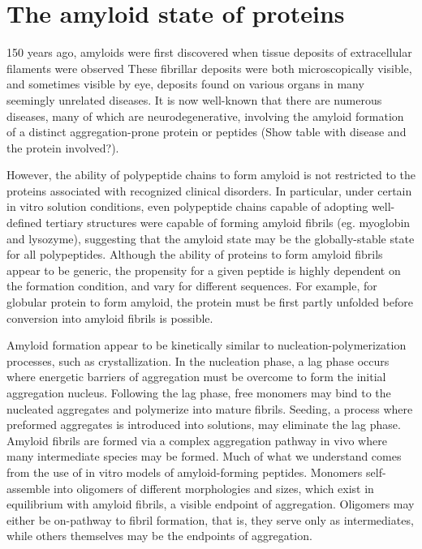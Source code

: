 \section{The amyloid state of proteins}

150 years ago, amyloids were first discovered when tissue deposits of extracellular filaments were observed\cite{Haass:2007db,Sipe:2000fs} These fibrillar deposits were both microscopically visible, and sometimes visible by eye, deposits found on various organs in many seemingly unrelated diseases. It is now well-known that there are numerous diseases, many of which are neurodegenerative, involving the amyloid formation of a distinct aggregation-prone protein or peptides (Show table with disease and the protein involved?).

However, the ability of polypeptide chains to form amyloid is not restricted to the proteins associated with recognized clinical disorders. In particular, under certain in vitro solution conditions, even polypeptide chains capable of adopting well-defined tertiary structures were capable of forming amyloid fibrils (eg. myoglobin and lysozyme), suggesting that the amyloid state may be the globally-stable state for all polypeptides.  Although the ability of proteins to form amyloid fibrils appear to be generic, the propensity for a given peptide is highly dependent on the formation condition, and vary for different sequences. For example, for globular protein to form amyloid, the protein must be first partly unfolded before conversion into amyloid fibrils is possible.

Amyloid formation appear to be kinetically similar to nucleation-polymerization processes, such as crystallization. In the nucleation phase, a lag phase occurs where energetic barriers of aggregation must be overcome to form the initial aggregation nucleus. Following the lag phase, free monomers may bind to the nucleated aggregates and polymerize into mature fibrils.\cite{Murphy:2002fe} Seeding, a process where preformed aggregates is introduced into solutions, may eliminate the lag phase.\cite{harper and lansbury 1997, Jarrett and lansbury 1993}  Amyloid fibrils are formed via a complex aggregation pathway in vivo where many intermediate species may be formed.  Much of what we understand comes from the use of in vitro models of amyloid-forming peptides. Monomers self-assemble into oligomers of different morphologies and sizes, which exist in equilibrium with amyloid fibrils, a visible endpoint of aggregation. Oligomers may either be on-pathway to fibril formation, that is, they serve only as intermediates, while others themselves may be the endpoints of aggregation.

